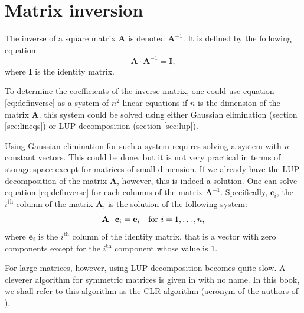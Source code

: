 \section{Matrix inversion}
\label{sec:matrixinversion} The inverse of a square matrix $\textbf{A}$ is denoted $\textbf{A}^{-1}$. It is defined by the following
equation:
\begin{equation}
\label{eq:definverse} \textbf{A}\cdot\textbf{A}^{-1}=\textbf{I},
\end{equation}
where $\textbf{I}$ is the identity matrix.

To determine the coefficients of the inverse matrix, one could use
equation \ref{eq:definverse} as a system of $n^2$ linear equations
if $n$ is the dimension of the matrix $\textbf{A}$. this system could
be solved using either Gaussian elimination (\cf section
\ref{sec:lineqs}) or LUP decomposition (\cf section
\ref{sec:lup}).

Using Gaussian elimination for such a system requires solving a
system with $n$ constant vectors. This could be done, but it is
not very practical in terms of storage space except for matrices
of small dimension. If we already have the LUP decomposition of
the matrix $\textbf{A}$, however, this is indeed a solution. One can
solve equation \ref{eq:definverse} for each columns of the matrix
$\textbf{A}^{-1}$. Specifically, $\textbf{c}_i$, the $i^{\mathop{th}}$
column of the matrix $\textbf{A}$, is the solution of the following
system:
\begin{equation}
  \textbf{A}\cdot\textbf{c}_i=\textbf{e}_i\mbox{\quad for $i=1,\ldots,n$},
\end{equation}
where $\textbf{e}_i$ is the $i^{\mathop{th}}$ column of the identity
matrix, that is a vector with zero components except for the
$i^{\mathop{th}}$ component whose value is 1.

For large matrices, however, using LUP decomposition becomes quite
slow. A cleverer algorithm for symmetric matrices is given in
\cite{CorLeiRiv} with no name. In this book, we shall refer to
this algorithm as the CLR algorithm (acronym of the authors of
\cite{CorLeiRiv}).

